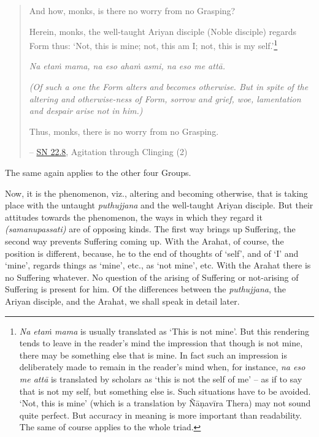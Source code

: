 \begin{quote}
And how, monks, is there no worry from no Grasping?

Herein, monks, the well-taught Ariyan disciple (Noble disciple) regards Form thus: `Not, this is mine; not, this am I; not, this is my self.'\footnote{\emph{Na etaṁ mama} is usually translated as `This is not mine'. But this rendering tends to leave in the reader's mind the impression that though  is not mine, there may be something else that is mine. In fact such an impression is deliberately made to remain in the reader's mind when, for instance, \emph{na eso me attā} is translated by scholars as `this is not the self of me' -- as if to say that  is not my self, but something else is. Such situations have to be avoided. `Not, this is mine' (which is a translation by Ñāṇavīra Thera) may not sound quite perfect. But accuracy in meaning is more important than readability. The same of course applies to the whole triad.}

\emph{Na etaṁ mama, na eso ahaṁ asmi, na eso me attā.}

\emph{(Of such a one the Form alters and becomes otherwise. But in spite of the altering and otherwise-ness of Form, sorrow and grief, woe, lamentation and despair arise not in him.)}

Thus, monks, there is no worry from no Grasping.

 -- \href{https://suttacentral.net/sn22.8/en/bodhi}{SN 22.8}, Agitation through Clinging (2)
\end{quote}

The same again applies to the other four Groups.

Now, it is the  phenomenon, viz., altering and becoming otherwise, that is taking place with the untaught \emph{puthujjana} and the well-taught Ariyan disciple. But their attitudes towards the phenomenon, the ways in which they regard it \emph{(samanupassati)} are of opposing kinds. The first way brings up Suffering, the second way prevents Suffering coming up. With the Arahat, of course, the position is different, because, he  to the end of  thoughts of `self', and of `I' and `mine',  regards things as `mine', etc.,  as `not mine', etc. With the Arahat there is no Suffering whatever. No question of the arising of Suffering or not-arising of Suffering is present for him. Of the differences between the \emph{puthujjana}, the Ariyan disciple, and the Arahat, we shall speak in detail later.

